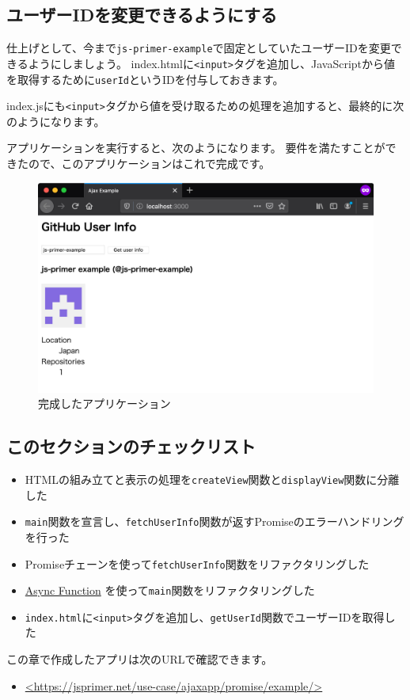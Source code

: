 \hypertarget{changeable-userid}{%
\subsection{ユーザーIDを変更できるようにする}\label{changeable-userid}}

仕上げとして、今まで\texttt{js-primer-example}で固定としていたユーザーIDを変更できるようにしましょう。
index.htmlに\texttt{<input>}タグを追加し、JavaScriptから値を取得するために\texttt{userId}というIDを付与しておきます。



index.jsにも\texttt{<input>}タグから値を受け取るための処理を追加すると、最終的に次のようになります。



アプリケーションを実行すると、次のようになります。
要件を満たすことができたので、このアプリケーションはこれで完成です。

\begin{figure}[h]
\centering
\includegraphics[width=140mm]{fig/fig-5.pdf}
\caption{完成したアプリケーション}
\end{figure}

\hypertarget{section-checklist}{%
\subsection{このセクションのチェックリスト}\label{section-checklist}}

\begin{itemize}
\item
  HTMLの組み立てと表示の処理を\texttt{createView}関数と\texttt{displayView}関数に分離した
\item
  \texttt{main}関数を宣言し、\texttt{fetchUserInfo}関数が返すPromiseのエラーハンドリングを行った
\item
  Promiseチェーンを使って\texttt{fetchUserInfo}関数をリファクタリングした
\item
  \hyperlink{async-function}{Async Function}
  を使って\texttt{main}関数をリファクタリングした
\item
  \texttt{index.html}に\texttt{<input>}タグを追加し、\texttt{getUserId}関数でユーザーIDを取得した
\end{itemize}

この章で作成したアプリは次のURLで確認できます。
\begin{itemize}
\item
  \url{<https://jsprimer.net/use-case/ajaxapp/promise/example/>}
\end{itemize}


